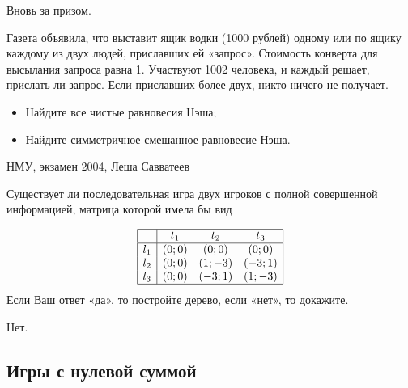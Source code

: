 \begin{problem}
 Вновь за призом.

Газета объявила, что выставит ящик водки (1000 рублей) одному или по ящику каждому из двух людей, приславших ей «запрос». Стоимость конверта для высылания запроса равна 1. Участвуют 1002 человека, и каждый решает, прислать ли запрос. Если приславших более двух, никто ничего не получает.
\begin{itemize}
\item Найдите все чистые равновесия Нэша;
\item  Найдите симметричное смешанное равновесие Нэша.
\end{itemize}



\begin{source}
НМУ, экзамен 2004, Леша Савватеев
\end{source}


\begin{sol}

\end{sol}
\end{problem}





\begin{problem}

Существует ли последовательная игра двух игроков с полной совершенной информацией,
матрица которой имела бы вид\par
\[\begin{array}{|c|ccc|}  \hline {} & {t_{1} } & {t_{2} } & {t_{3} } \\  \hline {l_{1} } & {\left(0;0\right)} & {\left(0;0\right)} & {\left(0;0\right)} \\ {l_{2} } & {\left(0;0\right)} & {\left(1;-3\right)} & {\left(-3;1\right)} \\ {l_{3} } & {\left(0;0\right)} & {\left(-3;1\right)} & {\left(1;-3\right)} \\  \hline  \end{array}\]
Если Ваш ответ «да», то постройте дерево, если «нет», то докажите.



\begin{sol}
Нет.
\end{sol}
\end{problem}






\subsection{Игры с нулевой суммой}



